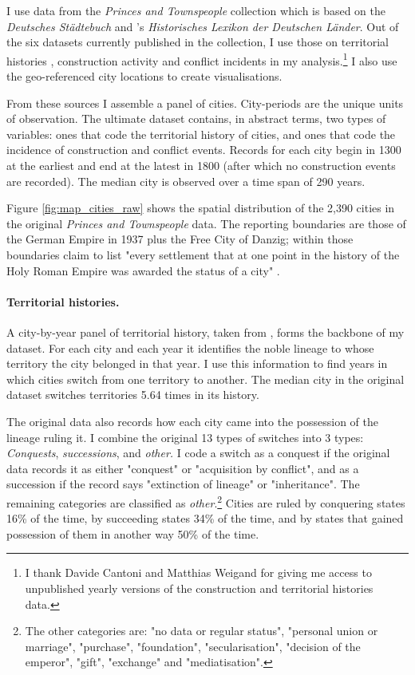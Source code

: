 \documentclass[11pt, a4paper]{article}
\begin{document}
I use data from the \textit{Princes and Townspeople} collection which is based on the \textit{Deutsches Städtebuch} \citep{keyser1939} and \cite{kobler2007}'s \textit{Historisches Lexikon der Deutschen Länder}. Out of the six datasets currently published in the collection, I use those on territorial histories \citep{pt2}, construction activity \citep{pt5} and conflict incidents \citep{pt6} in my analysis.\footnote{I thank Davide Cantoni and Matthias Weigand for giving me access to unpublished yearly versions of the construction and territorial histories data.} I also use the geo-referenced city locations \citep{pt1} to create visualisations. 

From these sources I assemble a panel of cities. City-periods are the unique units of observation. The ultimate dataset contains, in abstract terms, two types of variables: ones that code the territorial history of cities, and ones that code the incidence of construction and conflict events. Records for each city begin in 1300 at the earliest and end at the latest in 1800 (after which no construction events are recorded). The median city is observed over a time span of 290 years.

Figure \ref{fig:map_cities_raw} shows the spatial distribution of the 2,390 cities in the original \textit{Princes and Townspeople} data. The reporting boundaries are those of the German Empire in 1937 plus the Free City of Danzig; within those boundaries \cite{keyser1939} claim to list "every settlement that at one point in the history of the Holy Roman Empire was awarded the status of a city" \citep[p. 2]{pt1}.

\paragraph{Territorial histories.} 

A city-by-year panel of territorial history, taken from \cite{pt2}, forms the backbone of my dataset. For each city and each year it identifies the noble lineage to whose territory the city belonged in that year. I use this information to find years in which cities switch from one territory to another. The median city in the original dataset switches territories 5.64 times in its history. 

The original data also records how each city came into the possession of the lineage ruling it. I combine the original 13 types of switches into 3 types: \textit{Conquests}, \textit{successions}, and \textit{other.} I code a switch as a conquest if the original data records it as either "conquest" or "acquisition by conflict", and as a succession if the record says "extinction of lineage" or "inheritance". The remaining categories are classified as \textit{other}.\footnote
{
The other categories are: "no data or regular status", "personal union or marriage", "purchase", "foundation", "secularisation", "decision of the emperor", "gift", "exchange" and "mediatisation".
} 
Cities are ruled by conquering states 16\% of the time, by succeeding states 34\% of the time, and by states that gained possession of them in another way 50\% of the time.
\end{document}
